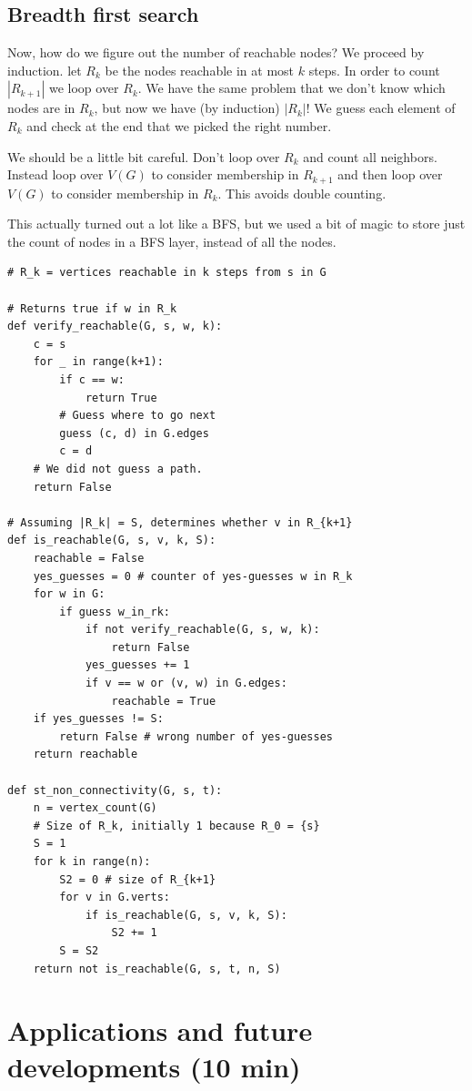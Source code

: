 \documentclass{article}
\theoremstyle{definition}
\theoremstyle{example}
\theoremstyle{plain}
\theoremstyle{plain}
\theoremstyle{definition}
\begin{document}
\subsection{Breadth first search}
Now, how do we figure out the number of reachable nodes? We proceed by induction. let $R_k$ be the nodes reachable in at most $k$ steps. In order to count $|R_{k+1}|$ we loop over $R_k$. We have the same problem that we don't know which nodes are in $R_k$, but now we have (by induction) $|R_k|$! We guess each element of $R_k$ and check at the end that we picked the right number.

We should be a little bit careful. Don't loop over $R_k$ and count all neighbors. Instead loop over $V(G)$ to consider membership in $R_{k+1}$ and then loop over $V(G)$ to consider membership in $R_k$. This avoids double counting.

This actually turned out a lot like a BFS, but we used a bit of magic to store just the count of nodes in a BFS layer, instead of all the nodes.

\begin{lstlisting}
# R_k = vertices reachable in k steps from s in G

# Returns true if w in R_k
def verify_reachable(G, s, w, k):
    c = s
    for _ in range(k+1):
        if c == w:
            return True
        # Guess where to go next
        guess (c, d) in G.edges
        c = d
    # We did not guess a path.
    return False

# Assuming |R_k| = S, determines whether v in R_{k+1}
def is_reachable(G, s, v, k, S):
    reachable = False
    yes_guesses = 0 # counter of yes-guesses w in R_k
    for w in G:
        if guess w_in_rk:
            if not verify_reachable(G, s, w, k):
                return False
            yes_guesses += 1
            if v == w or (v, w) in G.edges:
                reachable = True
    if yes_guesses != S:
        return False # wrong number of yes-guesses
    return reachable

def st_non_connectivity(G, s, t):
    n = vertex_count(G)
    # Size of R_k, initially 1 because R_0 = {s}
    S = 1
    for k in range(n):
        S2 = 0 # size of R_{k+1}
        for v in G.verts:
            if is_reachable(G, s, v, k, S):
                S2 += 1
        S = S2
    return not is_reachable(G, s, t, n, S)
\end{lstlisting}

\section{Applications and future developments (10 min)}
\end{document}
